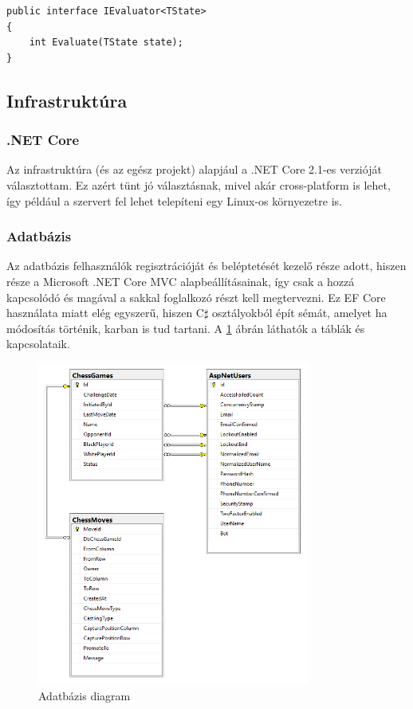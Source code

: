 \documentclass[twoside, a4paper, 12pt]{article}
\begin{document}
\begin{lstlisting}[caption=A kiértékelő interface, label=lst:algorithm_evaluator_code]
public interface IEvaluator<TState>
{
	int Evaluate(TState state);
}
\end{lstlisting}



\subsection{Infrastruktúra}
\subsubsection{.NET Core}
Az infrastruktúra (és az egész projekt) alapjául a .NET Core 2.1-es verzióját választottam. Ez azért tünt jó választásnak, mivel akár cross-platform is lehet, így például a szervert fel lehet telepíteni egy Linux-os környezetre is.

\subsubsection{Adatbázis}
Az adatbázis felhasználók regisztrációját és beléptetését kezelő része adott, hiszen része a Microsoft .NET Core MVC alapbeállításainak, így csak a hozzá kapcsolódó és magával a sakkal foglalkozó részt kell megtervezni. Ez EF Core használata miatt elég egyszerű, hiszen C$\sharp$ osztályokból épít sémát, amelyet ha módosítás történik, karban is tud tartani. A \ref{fig:dbdiagram} ábrán láthatók a táblák és kapcsolataik.

\begin{figure}[htbp]
	\centering
	\includegraphics[width=0.8\textwidth]{img/dbdiagram.png}
	\caption{Adatbázis diagram}
	\label{fig:dbdiagram}
\end{figure}
\end{document}
